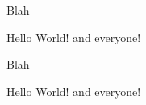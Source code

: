 \documentclass{exam}
\begin{document}
\printanswers

\begin{questions}

\question
Blah
\begin{randomizechoices}
\choice Hello
\choice World!
\CorrectChoice and
\choice everyone!
\end{randomizechoices}

\question
Blah
\begin{randomizechoices}
\choice Hello
\choice World!
\correctchoice and
\choice everyone!
\end{randomizechoices}

\end{questions}
\end{document}
